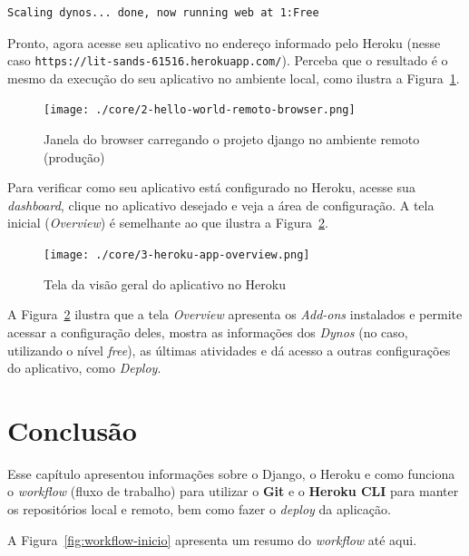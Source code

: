 \documentclass[brazil,a4paper,oneside,openright,parskip=full]{book}
\newcommand{\passthrough}[1]{#1}
\begin{document}
\begin{lstlisting}[style=nonumber]
Scaling dynos... done, now running web at 1:Free
\end{lstlisting}

Pronto, agora acesse seu aplicativo no endereço informado pelo Heroku
(nesse caso
\passthrough{\lstinline!https://lit-sands-61516.herokuapp.com/!}).
Perceba que o resultado é o mesmo da execução do seu aplicativo no
ambiente local, como ilustra a
Figura~\ref{fig:2-hello-world-remoto-browser}.

\begin{figure}
\hypertarget{fig:2-hello-world-remoto-browser}{%
\centering
\texttt{[image: ./core/2-hello-world-remoto-browser.png]}
\caption{Janela do browser carregando o projeto django no ambiente
remoto (produção)}\label{fig:2-hello-world-remoto-browser}
}
\end{figure}

Para verificar como seu aplicativo está configurado no Heroku, acesse
sua \emph{dashboard}, clique no aplicativo desejado e veja a área de
configuração. A tela inicial (\emph{Overview}) é semelhante ao que
ilustra a Figura~\ref{fig:3-heroku-app-overview}.

\begin{figure}
\hypertarget{fig:3-heroku-app-overview}{%
\centering
\texttt{[image: ./core/3-heroku-app-overview.png]}
\caption{Tela da visão geral do aplicativo no
Heroku}\label{fig:3-heroku-app-overview}
}
\end{figure}

A Figura~\ref{fig:3-heroku-app-overview} ilustra que a tela
\emph{Overview} apresenta os \emph{Add-ons} instalados e permite acessar
a configuração deles, mostra as informações dos \emph{Dynos} (no caso,
utilizando o nível \emph{free}), as últimas atividades e dá acesso a
outras configurações do aplicativo, como \emph{Deploy}.

\hypertarget{conclusuxe3o}{%
\section{Conclusão}\label{conclusuxe3o}}

Esse capítulo apresentou informações sobre o Django, o Heroku e como
funciona o \emph{workflow} (fluxo de trabalho) para utilizar o
\textbf{Git} e o \textbf{Heroku CLI} para manter os repositórios local e
remoto, bem como fazer o \emph{deploy} da aplicação.

A Figura~\ref{fig:workflow-inicio} apresenta um resumo do
\emph{workflow} até aqui.
\end{document}
